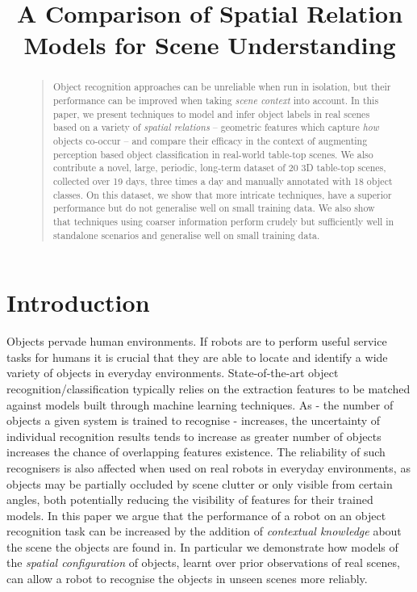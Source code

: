 \documentclass[letterpaper]{article}
\begin{document}
%
\title{A Comparison of Spatial Relation Models for Scene Understanding}
\maketitle
\begin{abstract}
\begin{quote}

Object recognition approaches can be unreliable when run in isolation, but their performance can be improved when taking \emph{scene context} into account. In this paper, we present techniques to model and infer object labels in real scenes based on a variety of \emph{spatial relations} -- geometric features which capture \textit{how} objects co-occur -- and compare their efficacy in the context of augmenting perception based object classification in real-world table-top scenes. We also contribute a novel, large, periodic, long-term dataset of 20 3D table-top scenes, collected over 19 days, three times a day and manually annotated with 18 object classes. On this dataset, we show that more intricate techniques, have a superior performance but do not generalise well on small training data. We also show that techniques using coarser information perform crudely but sufficiently well in standalone scenarios and generalise well on small training data.
\end{quote}
\end{abstract}

\section{Introduction}
\label{sec:Introduction}

Objects pervade human environments. If robots are to perform useful service tasks for humans it is crucial that they are able to locate and identify a wide variety of objects in everyday environments. State-of-the-art object recognition/classification typically relies on the extraction features to be matched against models built through machine learning techniques. As - the number of objects a given system is trained to recognise - increases, the uncertainty of individual recognition results tends to increase as greater number of objects increases the chance of overlapping features existence. The reliability of such recognisers is also affected when used on real robots in everyday environments, as objects may be partially occluded by scene clutter or only visible from certain angles, both potentially reducing the visibility of features for their trained models. In this paper we argue that the performance of a robot on an object recognition task can be increased by the addition of \emph{contextual knowledge} about the scene the objects are found in. In particular we demonstrate how models of the \emph{spatial configuration} of objects, learnt over prior observations of real scenes, can allow a robot to recognise the objects in unseen scenes more reliably. 
\end{document}
